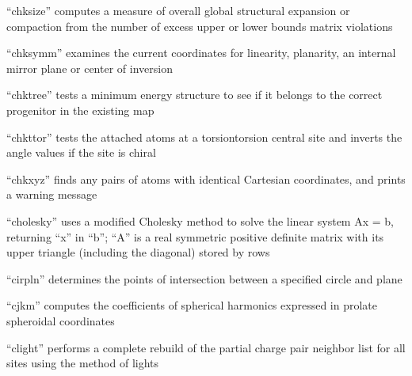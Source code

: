 \documentclass[letterpaper,11pt,english]{sphinxmanual}
\begin{document}
\sphinxAtStartPar
{}

\sphinxAtStartPar
“chksize” computes a measure of overall global structural expansion or compaction from the number of excess upper or lower bounds matrix violations

\sphinxAtStartPar
{}

\sphinxAtStartPar
{}

\sphinxAtStartPar
“chksymm” examines the current coordinates for linearity, planarity, an internal mirror plane or center of inversion

\sphinxAtStartPar
{}

\sphinxAtStartPar
“chktree” tests a minimum energy structure to see if it belongs to the correct progenitor in the existing map

\sphinxAtStartPar
{}

\sphinxAtStartPar
“chkttor” tests the attached atoms at a torsion\sphinxhyphen{}torsion central site and inverts the angle values if the site is chiral

\sphinxAtStartPar
{}

\sphinxAtStartPar
“chkxyz” finds any pairs of atoms with identical Cartesian coordinates, and prints a warning message

\sphinxAtStartPar
{}

\sphinxAtStartPar
“cholesky” uses a modified Cholesky method to solve the linear system Ax = b, returning “x” in “b”; “A” is a real symmetric positive definite matrix with its upper triangle (including the diagonal) stored by rows

\sphinxAtStartPar
{}

\sphinxAtStartPar
“cirpln” determines the points of intersection between a specified circle and plane

\sphinxAtStartPar
{}

\sphinxAtStartPar
“cjkm” computes the coefficients of spherical harmonics expressed in prolate spheroidal coordinates

\sphinxAtStartPar
{}

\sphinxAtStartPar
“clight” performs a complete rebuild of the partial charge pair neighbor list for all sites using the method of lights
\end{document}
